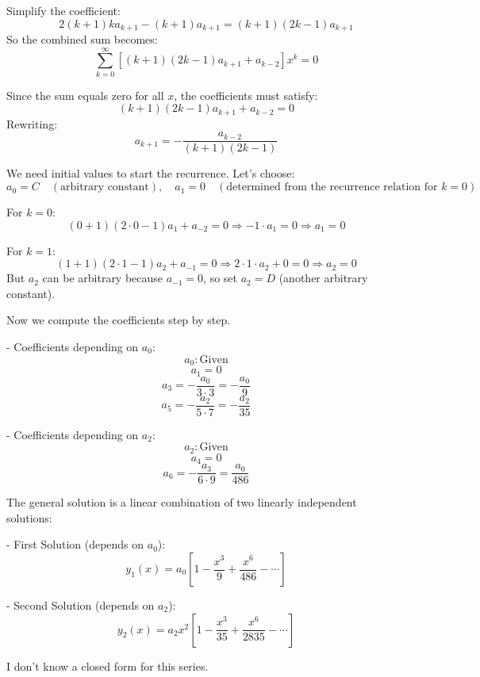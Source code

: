 \documentclass{article}
\begin{document}
\begin{enumerate}[label=(\alph*)]
{        Simplify the coefficient:
        \[
        2 (k+1) k a_{k+1} - (k+1) a_{k+1} = (k+1)(2k - 1) a_{k+1}
        \]
        So the combined sum becomes:
        \[
        \sum_{k=0}^{\infty} \left[ (k+1)(2k - 1) a_{k+1} + a_{k-2} \right] x^k = 0
        \]
        
        Since the sum equals zero for all \( x \), the coefficients must satisfy:
        \[
        (k+1)(2k - 1) a_{k+1} + a_{k-2} = 0
        \]
        Rewriting:
        \[
        a_{k+1} = -\frac{a_{k-2}}{(k+1)(2k - 1)}
        \]
    
        
        We need initial values to start the recurrence. Let's choose:
        \[
        a_0 = C \quad (\text{arbitrary constant}), \quad a_1 = 0 \quad (\text{determined from the recurrence relation for } k=0)
        \]
        
        For \( k=0 \):
        \[
        (0+1)(2 \cdot 0 - 1) a_1 + a_{-2} = 0 \Rightarrow -1 \cdot a_1 = 0 \Rightarrow a_1 = 0
        \]
        
        For \( k=1 \):
        \[
        (1+1)(2 \cdot 1 - 1) a_2 + a_{-1} = 0 \Rightarrow 2 \cdot 1 \cdot a_2 + 0 = 0 \Rightarrow a_2 = 0
        \]
        But \( a_2 \) can be arbitrary because \( a_{-1} = 0 \), so set \( a_2 = D \) (another arbitrary constant).
        
        Now we compute the coefficients step by step.
        
        - Coefficients depending on \( a_0 \):
          \[
          a_0: \text{Given}
          \]
          \[
          a_1 = 0
          \]
          \[
          a_3 = -\frac{a_0}{3 \cdot 3} = -\frac{a_0}{9}
          \]
          \[
          a_5 = -\frac{a_2}{5 \cdot 7} = -\frac{a_2}{35}
          \]
        
        - Coefficients depending on \( a_2 \):
          \[
          a_2: \text{Given}
          \]
          \[
          a_4 = 0
          \]
          \[
          a_6 = -\frac{a_3}{6 \cdot 9} = \frac{a_0}{486}
          \]
        
        The general solution is a linear combination of two linearly independent solutions:
        
        - First Solution (depends on \( a_0 \)):
          \[
          y_1(x) = a_0 \left[ 1 - \frac{x^3}{9} + \frac{x^6}{486} - \cdots \right]
          \]
        
        - Second Solution (depends on \( a_2 \)):
          \[
          y_2(x) = a_2 x^2 \left[ 1 - \frac{x^3}{35} + \frac{x^6}{2835} - \cdots \right]
          \]

          I don't know a closed form for this series.   
    }
\end{enumerate}
\end{document}
